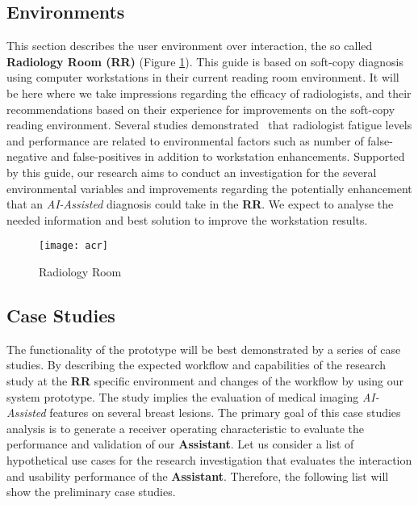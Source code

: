 \subsection{Environments}

This section describes the user environment over interaction, the so called \textbf{Radiology Room (RR)} (Figure \ref{fig:radioroom}). This guide is based on soft-copy diagnosis using computer workstations in their current reading room environment. It will be here where we take impressions regarding the efficacy of radiologists, and their recommendations based on their experience for improvements on the soft-copy reading environment. Several studies demonstrated~\cite{waite2017tired} that radiologist fatigue levels and performance are related to environmental factors such as number of false-negative and false-positives in addition to workstation enhancements. Supported by this guide, our research aims to conduct an investigation for the several environmental variables and improvements regarding the potentially enhancement that an \textit{AI-Assisted} diagnosis could take in the \textbf{RR}. We expect to analyse the needed information and best solution to improve the workstation results.


\hfill

\begin{figure}[h]
\centering
\texttt{[image: acr]}
\caption{Radiology Room}
\label{fig:radioroom}
\end{figure}

\hfill



\subsection{Case Studies}

The functionality of the prototype will be best demonstrated by a series of case studies. By describing the expected workflow and capabilities of the research study at the \textbf{RR} specific environment and changes of the workflow by using our system prototype. The study implies the evaluation of medical imaging \textit{AI-Assisted} features on several breast lesions. The primary goal of this case studies analysis is to generate a receiver operating characteristic to evaluate the performance and validation of our \textbf{Assistant}. Let us consider a list of hypothetical use cases for the research investigation that evaluates the interaction and usability performance of the \textbf{Assistant}. Therefore, the following list will show the preliminary case studies.

